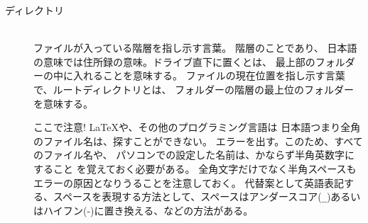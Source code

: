 \documentclass[titlepage]{ltjsarticle}
\begin{document}
\begin{description}
  \item [ディレクトリ] ~\\
    ファイルが入っている階層を指し示す言葉。
    階層のことであり、
    日本語の意味では住所録の意味。ドライブ直下に置くとは、
    最上部のフォルダーの中に入れることを意味する。
    ファイルの現在位置を指し示す言葉で、ルートディレクトリとは、
    フォルダーの階層の最上位のフォルダーを意味する。


    ここで注意! \LaTeX や、その他のプログラミング言語は
    日本語つまり全角のファイル名は、探すことができない。
    エラーを出す。このため、すべてのファイル名や、
    パソコンでの設定した名前は、かならず半角英数字にすること
    を覚えておく必要がある。
    全角文字だけでなく半角スペースもエラーの原因となりうることを注意しておく。
    代替案として英語表記する、スペースを表現する方法として、スペースはアンダースコア(\verb|_|)あるいはハイフン(-)に置き換える、などの方法がある。


\end{description}
\end{document}
